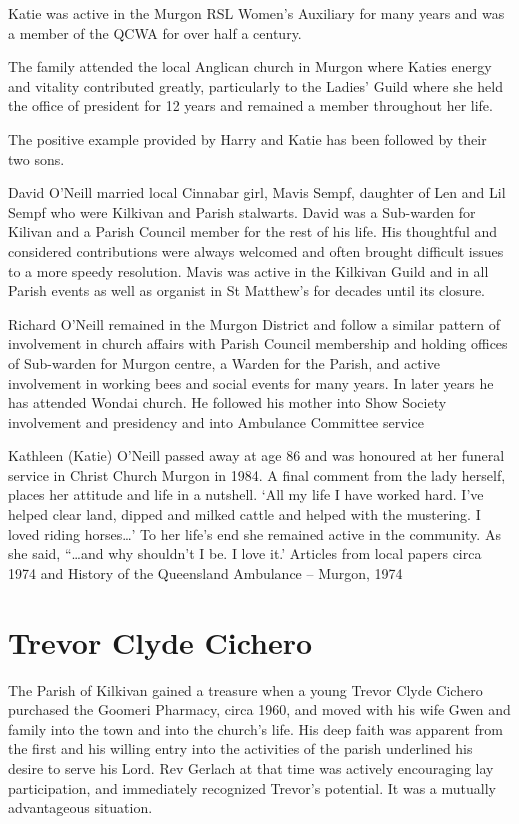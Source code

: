 Katie was active in the Murgon RSL Women's Auxiliary for many years and was a member of the QCWA for over half a century.

The family attended the local Anglican church in Murgon where Katies energy and vitality contributed greatly, particularly to the Ladies' Guild where she held the office of president for 12 years and remained a member throughout her life.

The positive example provided by Harry and Katie has been followed by their two sons.

David O'Neill married local Cinnabar girl, Mavis Sempf, daughter of Len and Lil Sempf who were Kilkivan and Parish stalwarts. David was a Sub-warden for Kilivan and a Parish Council member for the rest of his life. His thoughtful and considered contributions were always welcomed and often brought difficult issues to a more speedy resolution. Mavis was active in the Kilkivan Guild and in all Parish events as well as organist in St Matthew's for decades until its closure.

Richard O'Neill remained in the Murgon District and follow a similar pattern of involvement in church affairs with Parish Council membership and holding offices of Sub-warden for Murgon centre, a Warden for the Parish, and active involvement in working bees and social events for many years. In later years he has attended Wondai church. He followed his mother into Show Society involvement and presidency and into Ambulance Committee service

Kathleen (Katie) O'Neill passed away at age 86 and was honoured at her funeral service in Christ Church Murgon in 1984. A final comment from the lady herself, places her attitude and life in a nutshell. `All my life I have worked hard. I've helped clear land, dipped and milked cattle and helped with the mustering. I loved riding horses\ldots' To her life's end she remained active in the community. As she said, ``\ldots and why shouldn't I be. I love it.' Articles from local papers circa 1974 and History of the Queensland Ambulance -- Murgon, 1974

\hypertarget{trevor-clyde-cichero}{%
\section{Trevor Clyde Cichero}\label{trevor-clyde-cichero}}

The Parish of Kilkivan gained a treasure when a young Trevor Clyde Cichero purchased the Goomeri Pharmacy, circa 1960, and moved with his wife Gwen and family into the town and into the church's life. His deep faith was apparent from the first and his willing entry into the activities of the parish underlined his desire to serve his Lord. Rev Gerlach at that time was actively encouraging lay participation, and immediately recognized Trevor's potential. It was a mutually advantageous situation.

